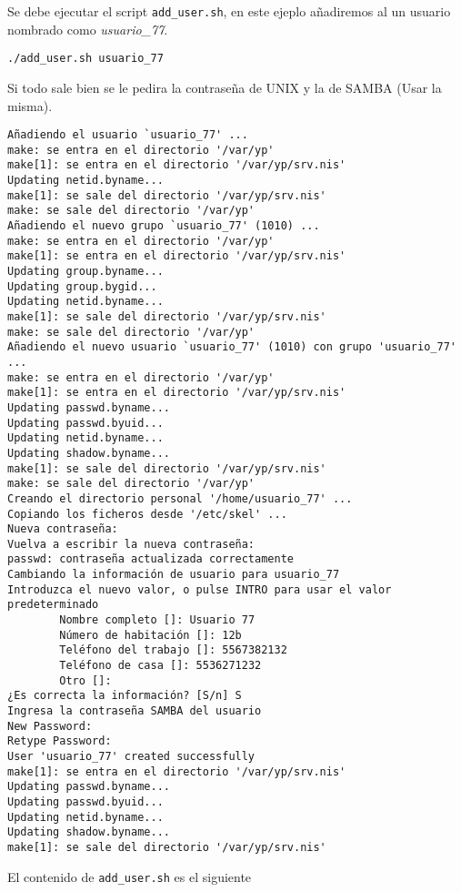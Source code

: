 \documentclass[../main.tex]{subfiles}
\begin{document}
Se debe ejecutar el script \lstinline|add_user.sh|,
en este ejeplo añadiremos al un usuario nombrado como
\textit{usuario\_77}.

\begin{lstlisting}
./add_user.sh usuario_77
\end{lstlisting}

Si todo sale bien se le pedira la contraseña de UNIX y
la de SAMBA (Usar la misma).

\begin{lstlisting}
Añadiendo el usuario `usuario_77' ...
make: se entra en el directorio '/var/yp'
make[1]: se entra en el directorio '/var/yp/srv.nis'
Updating netid.byname...
make[1]: se sale del directorio '/var/yp/srv.nis'
make: se sale del directorio '/var/yp'
Añadiendo el nuevo grupo `usuario_77' (1010) ...
make: se entra en el directorio '/var/yp'
make[1]: se entra en el directorio '/var/yp/srv.nis'
Updating group.byname...
Updating group.bygid...
Updating netid.byname...
make[1]: se sale del directorio '/var/yp/srv.nis'
make: se sale del directorio '/var/yp'
Añadiendo el nuevo usuario `usuario_77' (1010) con grupo 'usuario_77' ...
make: se entra en el directorio '/var/yp'
make[1]: se entra en el directorio '/var/yp/srv.nis'
Updating passwd.byname...
Updating passwd.byuid...
Updating netid.byname...
Updating shadow.byname...
make[1]: se sale del directorio '/var/yp/srv.nis'
make: se sale del directorio '/var/yp'
Creando el directorio personal '/home/usuario_77' ...
Copiando los ficheros desde '/etc/skel' ...
Nueva contraseña:
Vuelva a escribir la nueva contraseña:
passwd: contraseña actualizada correctamente
Cambiando la información de usuario para usuario_77
Introduzca el nuevo valor, o pulse INTRO para usar el valor predeterminado
        Nombre completo []: Usuario 77
        Número de habitación []: 12b
        Teléfono del trabajo []: 5567382132
        Teléfono de casa []: 5536271232
        Otro []:
¿Es correcta la información? [S/n] S
Ingresa la contraseña SAMBA del usuario
New Password:
Retype Password:
User 'usuario_77' created successfully
make[1]: se entra en el directorio '/var/yp/srv.nis'
Updating passwd.byname...
Updating passwd.byuid...
Updating netid.byname...
Updating shadow.byname...
make[1]: se sale del directorio '/var/yp/srv.nis'
\end{lstlisting}

El contenido de \lstinline{add_user.sh} es el siguiente


\end{document}
